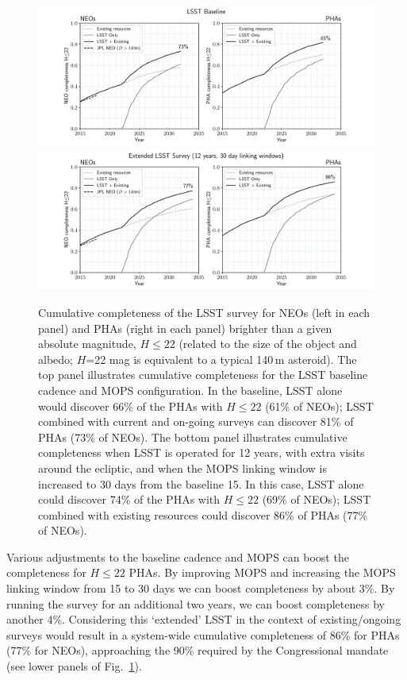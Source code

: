 \begin{figure}
\includegraphics[width=1.\hsize,clip]{neo_pha_completeness_3in15_minion_1016}
\includegraphics[width=1.\hsize,clip]{neo_pha_completeness_3in30_astro_lsst_01_1016}
\caption{Cumulative completeness of the LSST survey for NEOs (left in each panel) and PHAs (right in each panel)
brighter than a given absolute magnitude, $H\le22$ (related to the size of the object and albedo;
$H$=22 mag is equivalent to a typical 140\,m asteroid). The top panel illustrates cumulative completeness
for the LSST baseline cadence and MOPS configuration. In the baseline, LSST alone would discover 66\% of the PHAs
with $H\le22$ (61\% of NEOs); LSST combined with current and on-going
surveys
can discover 81\% of PHAs (73\% of NEOs). The bottom panel illustrates cumulative
completeness when LSST is operated for 12 years, with extra visits around the ecliptic, and when the MOPS linking
window is increased to 30 days from the baseline 15. In this case, LSST alone could discover 74\% of the PHAs with
$H\le22$ (69\% of NEOs); LSST combined with existing resources could discover 86\% of PHAs (77\% of NEOs).
}
\label{Fig:Cneo}
\end{figure}

Various adjustments to the baseline cadence and MOPS can boost the completeness for $H\le22$ PHAs.
By improving MOPS and increasing the MOPS linking window from 15 to 30 days we can boost completeness
by about 3\%. By running the survey for an additional two years, we can boost completeness by another 4\%.
Considering this `extended' LSST in the context of existing/ongoing surveys would result in a system-wide cumulative completeness of 86\% for PHAs (77\% for NEOs), approaching the 90\% required by the Congressional mandate (see
lower panels of Fig.~\ref{Fig:Cneo}).

